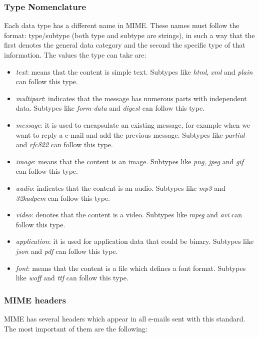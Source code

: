 \subsubsection{Type Nomenclature}\label{sssect:MIMEtype}

Each data type has a different name in MIME. These names must follow the format: type/subtype (both type and subtype are strings), in such a way that the first denotes the general data category and the second the specific type of that information. The values the type can take are:

\begin{itemize}
	\item\textit{text}: means that the content is simple text. Subtypes like \textit{html}, \textit{xml} and \textit{plain} can follow this type.
	\item\textit{multipart}: indicates that the message has numerous parts with independent data. Subtypes like \textit{form-data} and \textit{digest} can follow this type.
	\item\textit{message}: it is used to encapsulate an existing message, for example when we want to reply a e-mail and add the previous message. Subtypes like \textit{partial} and \textit{rfc822} can follow this type.
	\item\textit{image}: means that the content is an image. Subtypes like \textit{png}, \textit{jpeg} and \textit{gif} can follow this type.
	\item\textit{audio}: indicates that the content is an audio. Subtypes like \textit{mp3} and \textit{32kadpcm} can follow this type.
	\item\textit{video}: denotes that the content is a video. Subtypes like \textit{mpeg} and \textit{avi} can follow this type.
	\item\textit{application}: it is used for application data that could be binary. Subtypes like \textit{json} and \textit{pdf} can follow this type.
	\item\textit{font}: means that the content is a file which defines a font format. Subtypes like \textit{woff} and \textit{ttf} can follow this type.
\end{itemize}

\subsubsection{MIME headers} \label{sssect:MIMEheaders}

MIME has several headers which appear in all e-mails sent with this standard. The most important of them are the following:

